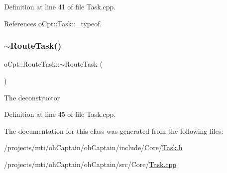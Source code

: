 Definition at line 41 of file Task.\+cpp.



References o\+Cpt\+::\+Task\+::\+\_\+typeof.

\hypertarget{classo_cpt_1_1_route_task_a036b646437996f15a9e74bc12c14aa35}{}\label{classo_cpt_1_1_route_task_a036b646437996f15a9e74bc12c14aa35} 
\subsubsection{\texorpdfstring{$\sim$\+Route\+Task()}{~RouteTask()}}
{\footnotesize\ttfamily o\+Cpt\+::\+Route\+Task\+::$\sim$\+Route\+Task (\begin{DoxyParamCaption}{ }\end{DoxyParamCaption})\hspace{0.3cm}{\ttfamily [virtual]}}

The deconstructor 

Definition at line 45 of file Task.\+cpp.



The documentation for this class was generated from the following files\+:\begin{DoxyCompactItemize}
\item 
/projects/mti/oh\+Captain/oh\+Captain/include/\+Core/\hyperlink{_task_8h}{Task.\+h}\item 
/projects/mti/oh\+Captain/oh\+Captain/src/\+Core/\hyperlink{_task_8cpp}{Task.\+cpp}\end{DoxyCompactItemize}
